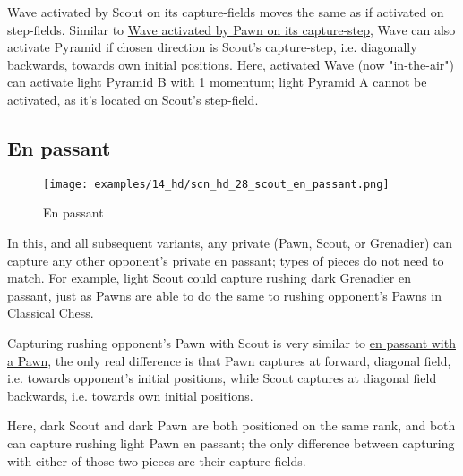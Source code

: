 \vspace*{-0.5\baselineskip}
Wave activated by Scout on its capture-fields moves the same as if activated on
step-fields. Similar to
\hyperref[fig:scn_mv_024_wave_activated_by_capture_pawn]{Wave activated by Pawn on its capture-step},
Wave can also activate Pyramid if chosen direction is Scout's capture-step, i.e.
diagonally backwards, towards own initial positions.\newline
\indent
Here, activated Wave (now "in-the-air") can activate light Pyramid B with 1 momentum;
light Pyramid A cannot be activated, as it's located on Scout's step-field.

\clearpage %

\subsection*{En passant}
\label{sec:Hemera's Dawn/Scout/En passant}

\vspace*{-0.7\baselineskip}
\noindent
\begin{wrapfigure}[14]{l}{0.4\textwidth}
\centering
\texttt{[image: examples/14\_hd/scn\_hd\_28\_scout\_en\_passant.png]}
\vspace*{-0.3\baselineskip}
\caption{En passant}
\label{fig:scn_hd_28_scout_en_passant}
\end{wrapfigure}
\indent
In this, and all subsequent variants, any private (Pawn, Scout, or Grenadier) can
capture any other opponent's private en passant; types of pieces do not need to
match.\newline
\indent
For example, light Scout could capture rushing dark Grenadier en passant, just as
Pawns are able to do the same to rushing opponent's Pawns in Classical Chess.

Capturing rushing opponent's Pawn with Scout is very similar to
\href{https://en.wikipedia.org/wiki/En_passant}{en passant with a Pawn},
the only real difference is that Pawn captures at forward, diagonal field,
i.e. towards opponent's initial positions, while Scout captures at diagonal
field backwards, i.e. towards own initial positions.

Here, dark Scout and dark Pawn are both positioned on the same rank, and both
can capture rushing light Pawn en passant; the only difference between capturing
with either of those two pieces are their capture-fields.

